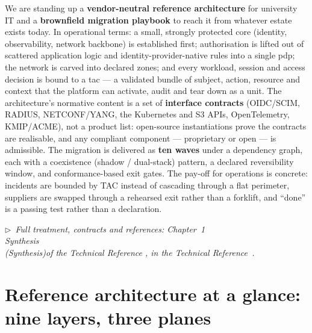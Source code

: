 \documentclass[11pt,a4paper,twoside]{article}
\newcommand{\keyword}[1]{\textbf{#1}}
\newcommand{\trchap}[2]{%
  Chapter~#1%
  \ifx\\#2\\\else\space(\emph{#2})\fi\space of the Technical Reference%
}
\newcommand{\mainref}[1]{%
  \par\vspace{1pt}
  {\footnotesize\color{gray}\itshape
  $\triangleright$~Full treatment, contracts and references: #1,
  in the Technical Reference~\cite{ng-tech-ref-2026}.}\par\vspace{2pt}}
\begin{document}
\noindent We are standing up a \keyword{vendor-neutral reference
architecture} for university IT and a \keyword{brownfield migration
playbook} to reach it from whatever estate exists today. In operational
terms: a small, strongly protected core (identity, observability, network
backbone) is established first; authorisation is lifted out of scattered
application logic and identity-provider-native rules into a single
\gls{pdp}; the network is carved into declared zones; and every workload,
session and access decision is bound to a \gls{tac} --- a validated bundle of
subject, action, resource and context that the platform can activate,
audit and tear down as a unit. The architecture's normative content is a
set of \keyword{interface contracts} (OIDC/SCIM, RADIUS, NETCONF/YANG, the
Kubernetes and S3 APIs, OpenTelemetry, KMIP/ACME), not a product list:
open-source instantiations prove the contracts are realisable, and any
compliant component --- proprietary or open --- is admissible.
The migration is delivered as \keyword{ten waves} under a dependency graph,
each with a coexistence (shadow / dual-stack) pattern, a declared
reversibility window, and conformance-based exit gates. The pay-off for
operations is concrete: incidents are bounded by TAC instead of cascading
through a flat perimeter, suppliers are swapped through a rehearsed exit
rather than a forklift, and ``done'' is a passing test rather than a
declaration.

\mainref{\trchap{1}{Synthesis}}

\section{Reference architecture at a glance: nine layers, three planes}
\end{document}
